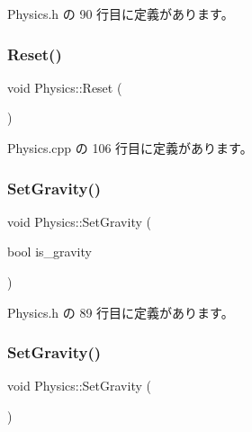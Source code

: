  Physics.\+h の 90 行目に定義があります。

\mbox{\label{class_physics_a7ba30ff9f5a0a0a12616ed861f68a20f}} 
\subsubsection{\texorpdfstring{Reset()}{Reset()}}
{\footnotesize\ttfamily void Physics\+::\+Reset (\begin{DoxyParamCaption}{ }\end{DoxyParamCaption})\hspace{0.3cm}{\ttfamily [private]}}



 Physics.\+cpp の 106 行目に定義があります。

\mbox{\label{class_physics_a6f4c3f73eb1d2669ccc449b0d74f9d32}} 
\subsubsection{\texorpdfstring{Set\+Gravity()}{SetGravity()}\hspace{0.1cm}{\footnotesize\ttfamily [1/2]}}
{\footnotesize\ttfamily void Physics\+::\+Set\+Gravity (\begin{DoxyParamCaption}\item[{bool}]{is\+\_\+gravity }\end{DoxyParamCaption})\hspace{0.3cm}{\ttfamily [inline]}}



 Physics.\+h の 89 行目に定義があります。

\mbox{\label{class_physics_ac52e3e0cccd6268aa592d1e5f098a685}} 
\subsubsection{\texorpdfstring{Set\+Gravity()}{SetGravity()}\hspace{0.1cm}{\footnotesize\ttfamily [2/2]}}
{\footnotesize\ttfamily void Physics\+::\+Set\+Gravity (\begin{DoxyParamCaption}{ }\end{DoxyParamCaption})\hspace{0.3cm}{\ttfamily [private]}}



